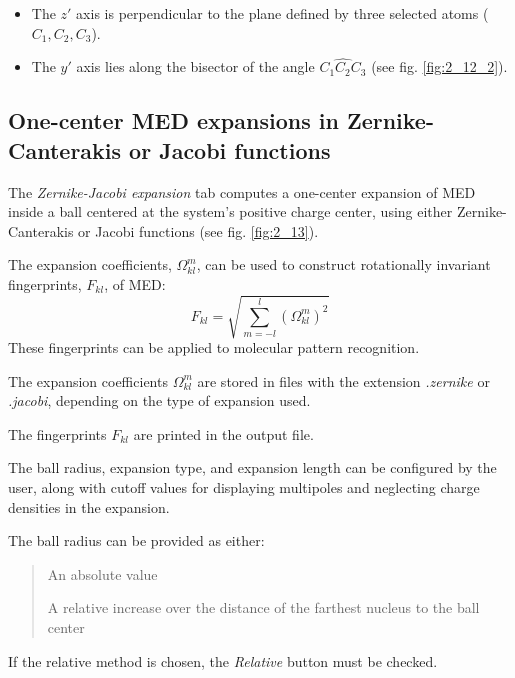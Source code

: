 \documentclass[10pt]{article}
\begin{document}
\begin{itemize}
\item The $z'$ axis is perpendicular to the plane defined
by three selected atoms ($C_1, C_2, C_3$).
\item The $y'$ axis lies along the bisector of the angle $\widehat{C_1C_2C_3}$
(see fig. \ref{fig:2_12_2}).
\end{itemize}

\subsection{One-center MED expansions in Zernike-Canterakis or Jacobi functions \label{sec:2.13}}

The {\it Zernike-Jacobi expansion} tab computes a one-center expansion
of MED inside a ball centered at the system's positive charge center,
using either Zernike-Canterakis or Jacobi functions (see fig. \ref{fig:2_13}).

The expansion coefficients, $\Omega_{kl}^m$,
can be used to construct rotationally invariant fingerprints, $F_{kl}$, of MED:
% 
$$ 
F_{kl} = \sqrt{ \sum_{m=-l}^l (\Omega_{kl}^m)^2 } 
$$
%
These fingerprints can be applied to molecular pattern recognition.

The expansion coefficients $\Omega_{kl}^m$ are stored in files
with the extension {\it .zernike} or {\it .jacobi},
depending on the type of expansion used.

The fingerprints $F_{kl}$ are printed in the output file.

The ball radius, expansion type, and expansion length can be configured by the user,
along with cutoff values for displaying multipoles and neglecting charge densities in the expansion.

\begin{itemize}
\item The ball radius can be provided as either:
\vspace*{-5mm}
\begin{quote}
\item An absolute value
\item A relative increase over the distance of the farthest nucleus to the ball center
\end{quote}

\item If the relative method is chosen, the {\it Relative} button must be checked.
\end{itemize}
\end{document}
